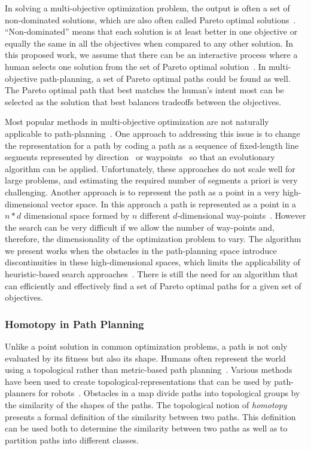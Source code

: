 \documentclass[phd]{byuprop}
\begin{document}
In solving a multi-objective optimization problem, the output is often a set of non-dominated solutions, which are also often called Pareto optimal solutions~\cite{Miettinen1999}.
``Non-dominated''  means that each solution is at least better in one objective or equally the same in all the objectives when compared to any other solution.
In this proposed work, we assume that there can be an interactive process where a human selects one solution from the set of Pareto optimal solution~\cite{Marler2004}.
In multi-objective path-planning, a set of Pareto optimal paths could be found as well.
The Pareto optimal path that best matches the human's intent most can be selected as the solution that best balances tradeoffs between the objectives.

Most popular methods in multi-objective optimization are not naturally applicable to path-planning~\cite{Zhang2007,Deb2014}.
One approach to addressing this issue is to change the representation for a path by coding a path as a sequence of fixed-length line segments represented by direction~\cite{Ahmed2013,Howlett2006} or waypoints~\cite{Sujit2009,Pires2004} so that an evolutionary algorithm can be applied. 
Unfortunately, these approaches do not scale well for large problems, and estimating the required number of segments a priori is very challenging. 
Another approach is to represent the path as a point in a very high-dimensional vector space.
In this approach a path is represented as a point in a $ n * d $ dimensional space formed by $ n $ different  $d$-dimensional way-points~\cite{Ahmed2011,Ahmed2013}.
However the search can be very difficult if we allow the number of way-points and, therefore, the dimensionality of the optimization problem to vary. 
The algorithm we present works when the obstacles in the path-planning space introduce discontinuities in these high-dimensional spaces, which limits the applicability of heuristic-based search approaches~\cite{Sujit2009,Zhang2007}.
There is still the need for an algorithm that can efficiently and effectively find a set of Pareto optimal paths for a given set of objectives.

\subsubsection{Homotopy in Path Planning}
\label{sec:related_work:algorithm_specific_work:homotopy_in_path_planning}


Unlike a point solution in common optimization problems, a path is not only evaluated by its fitness but also its shape.
Humans often represent the world using a topological rather than metric-based path planning~\cite{Aginsky1997,kuipers1999}. 
Various methods have been used to create topological-representations that can be used by path-planners for robots~\cite{Mataric1992,Thrun1998,Fasola2013,Shah2013}.
Obstacles in a map divide paths into topological groups by the similarity of the shapes of the paths. 
The topological notion of {\em homotopy} presents a formal definition of the similarity between two paths. 
This definition can be used both to determine the similarity between two paths as well as to partition paths into different classes.
\end{document}
